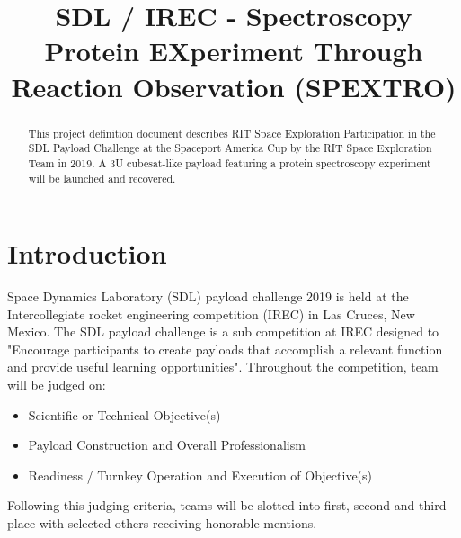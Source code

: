 \documentclass[conference]{IEEEtran} %
\title{SDL / IREC - Spectroscopy Protein EXperiment Through Reaction Observation (SPEXTRO)}
\author{
  \IEEEauthorblockN{%
    Dylan~Wagner\IEEEauthorrefmark{1},  %
    T.J.~Tarazevits\IEEEauthorrefmark{2},
    Keshav~Adhyay\IEEEauthorrefmark{3},
    Matthew~Glazer\IEEEauthorrefmark{4},
    and 
    Luc Chartier\IEEEauthorrefmark{5}
  }
  \IEEEauthorblockA{%
    RIT Space Exploration, Rochester Institute of Technology \\ %
    Rochester, N.Y. \\
    Email:
    \IEEEauthorrefmark{1}drw6528@rit.edu,
    \IEEEauthorrefmark{2}tjt3085@rit.edu,
    \IEEEauthorrefmark{3}kar4669@rit.edu,
    \IEEEauthorrefmark{4}msg1254@rit.edu,
    \IEEEauthorrefmark{5}lmc7150@rit.edu
  }

}
\begin{document}
\maketitle%

\begin{abstract}
This project definition document describes RIT Space Exploration Participation in the SDL Payload Challenge at the Spaceport America Cup by the RIT Space Exploration Team in 2019. A 3U cubesat-like payload featuring a protein spectroscopy experiment will be launched and recovered.

\end{abstract}



\section{Introduction}
\label{sec:introduction}

 Space Dynamics Laboratory (SDL) payload challenge 2019 is held at the Intercollegiate rocket engineering competition (IREC) in Las Cruces, New Mexico. The SDL payload challenge is a sub competition at IREC designed to "Encourage participants to create payloads that accomplish a relevant function and provide useful learning opportunities". Throughout the competition, team will be judged on: 
\begin{itemize}
	\item Scientific or Technical Objective(s)
	\item Payload Construction and Overall Professionalism 
	\item Readiness / Turnkey Operation and Execution of Objective(s) ~\cite{sdl}
\end{itemize} Following this judging criteria, teams will be slotted into first, second and third place with selected others receiving honorable mentions.
\end{document}
